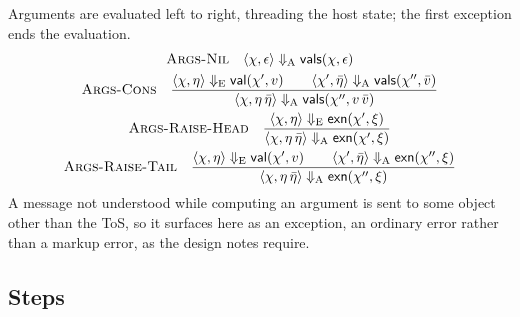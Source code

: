 \documentclass[11pt]{article}
\numberwithin{equation}{section}
\newcommand{\kw}[1]{\ensuremath{\mathsf{#1}}}
\newcommand{\rulelabel}[1]{\textsc{#1}}
\begin{document}
Arguments are evaluated left to right, threading the host state; the first
exception ends the evaluation.
\begin{gather}
\label{eq:args-nil}
\rulelabel{Args-Nil}\quad
\langle \chi, \epsilon \rangle \Downarrow_{\mathrm{A}} \kw{vals}(\chi, \epsilon)
\\
\label{eq:args-cons}
\rulelabel{Args-Cons}\quad
\frac{\langle \chi, \eta \rangle \Downarrow_{\mathrm{E}} \kw{val}(\chi', v)
      \qquad \langle \chi', \bar\eta \rangle \Downarrow_{\mathrm{A}}
        \kw{vals}(\chi'', \bar v)}
     {\langle \chi, \eta\,\bar\eta \rangle \Downarrow_{\mathrm{A}}
        \kw{vals}(\chi'', v\,\bar v)}
\\
\label{eq:args-raise-head}
\rulelabel{Args-Raise-Head}\quad
\frac{\langle \chi, \eta \rangle \Downarrow_{\mathrm{E}} \kw{exn}(\chi', \xi)}
     {\langle \chi, \eta\,\bar\eta \rangle \Downarrow_{\mathrm{A}}
        \kw{exn}(\chi', \xi)}
\\
\label{eq:args-raise-tail}
\rulelabel{Args-Raise-Tail}\quad
\frac{\langle \chi, \eta \rangle \Downarrow_{\mathrm{E}} \kw{val}(\chi', v)
      \qquad \langle \chi', \bar\eta \rangle \Downarrow_{\mathrm{A}}
        \kw{exn}(\chi'', \xi)}
     {\langle \chi, \eta\,\bar\eta \rangle \Downarrow_{\mathrm{A}}
        \kw{exn}(\chi'', \xi)}
\end{gather}
A message not understood while computing an argument is sent to some
object other than the ToS, so it surfaces here as an exception, an ordinary
error rather than a markup error, as the design notes require.

\subsection{Steps}
\end{document}

